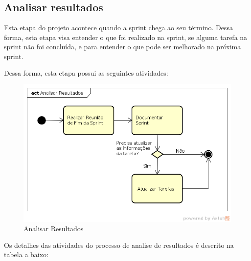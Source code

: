 \documentclass[a4paper, 11pt]{article}
\begin{document}
\subsection*{Analisar resultados}

Esta etapa do projeto acontece quando a sprint chega ao seu término. Dessa
forma, esta etapa visa entender o que foi realizado na sprint, se alguma
tarefa na sprint não foi concluída, e para entender o que pode ser melhorado
na próxima sprint.

Dessa forma, esta etapa possui as seguintes atividades:

\begin{figure}[ht!]
\centering
\includegraphics[width=150mm]{check_result.png}
\caption{Analisar Resultados\label{overflow}}
\end{figure}

\pagebreak

Os detalhes das atividades do processo de analise de resultados é descrito na
tabela a baixo:
\end{document}
